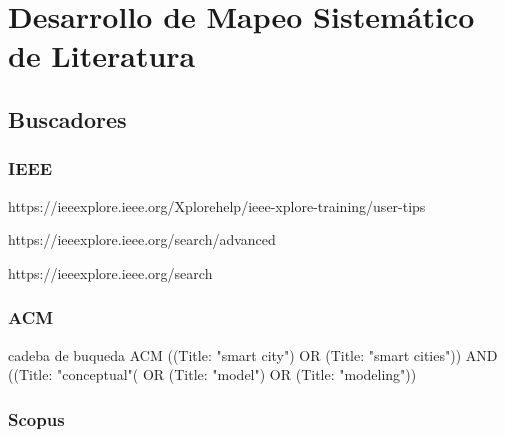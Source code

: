 \documentclass[runningheads,a4paper,spanish]{llncs}
\begin{document}
 

\section{Desarrollo de Mapeo Sistemático de Literatura}

\subsection{Buscadores}\label{fuentes}


\subsubsection{IEEE}\label{ieee}

https://ieeexplore.ieee.org/Xplorehelp/ieee-xplore-training/user-tips

https://ieeexplore.ieee.org/search/advanced

https://ieeexplore.ieee.org/search

\subsubsection{ACM}\label{acm}



cadeba de buqueda ACM
((Title: "smart city") OR (Title: "smart cities")) AND ((Title: "conceptual"( OR (Title: "model") OR (Title: "modeling"))

\subsubsection{Scopus}\label{scopus}

\end{document}
